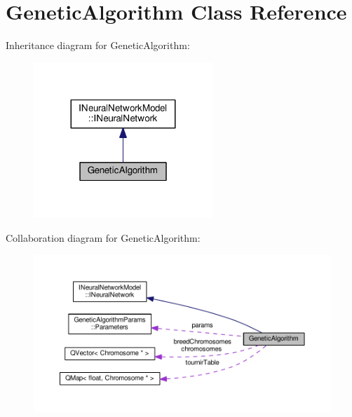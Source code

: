 \hypertarget{class_genetic_algorithm}{}\section{Genetic\+Algorithm Class Reference}
\label{class_genetic_algorithm}


Inheritance diagram for Genetic\+Algorithm\+:\nopagebreak
\begin{figure}[H]
\begin{center}
\leavevmode
\includegraphics[width=191pt]{class_genetic_algorithm__inherit__graph}
\end{center}
\end{figure}


Collaboration diagram for Genetic\+Algorithm\+:\nopagebreak
\begin{figure}[H]
\begin{center}
\leavevmode
\includegraphics[width=350pt]{class_genetic_algorithm__coll__graph}
\end{center}
\end{figure}
